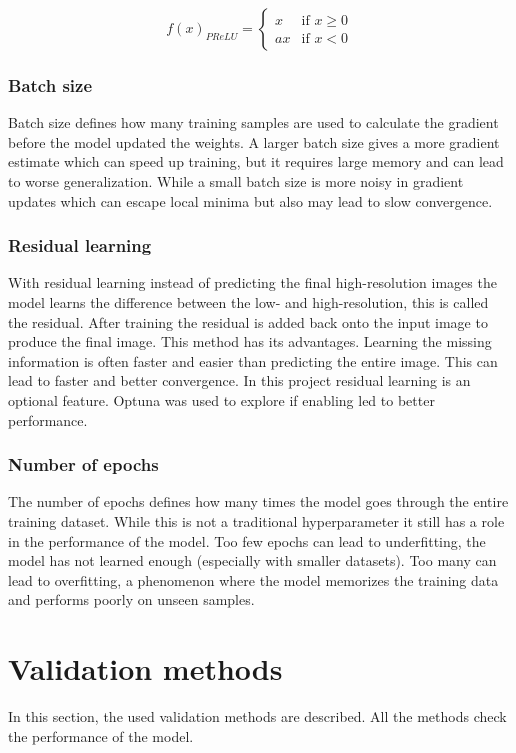 \documentclass[twocolumn]{article}
\begin{document}
\begin{equation}\label{eq:7}
f(x)_{PReLU} = 
\begin{cases}
x & \text{if } x \geq 0 \\
a x & \text{if } x < 0
\end{cases}
\end{equation}

\subsubsection{Batch size}
Batch size defines how many training samples are used to calculate the gradient before the model updated the weights. A larger batch size gives a more gradient estimate which can speed up training, but it requires large memory and can lead to worse generalization. While a small batch size is more noisy in gradient updates which can escape local minima but also may lead to slow convergence. 
\subsubsection{Residual learning}
With residual learning instead of predicting the final high-resolution images the model learns the difference between the low- and high-resolution, this is called the residual. After training the residual is added back onto the input image to produce the final image. This method has its advantages. Learning the missing information is often faster and easier than predicting the entire image. This can lead to faster and better convergence. In this project residual learning is an optional feature. Optuna was used to explore if enabling led to better performance.

\subsubsection{Number of epochs}
The number of epochs defines how many times the model goes through the entire training dataset. While this is not a traditional hyperparameter it still has a role in the performance of the model. Too few epochs can lead to underfitting, the model has not learned enough (especially with smaller datasets). Too many can lead to overfitting, a phenomenon where the model memorizes the training data and performs poorly on unseen samples. 

\section{Validation methods}
In this section, the used validation methods are described. All the methods check the performance of the model. 
\end{document}
